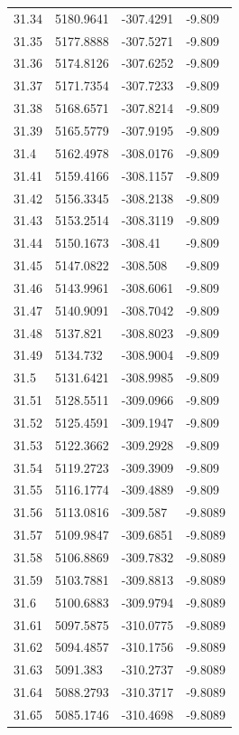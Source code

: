\begin{table}[H]
\begin{tabular}{llll}
31.34 & 5180.9641 & -307.4291 & -9.809 \\
31.35 & 5177.8888 & -307.5271 & -9.809 \\
31.36 & 5174.8126 & -307.6252 & -9.809 \\
31.37 & 5171.7354 & -307.7233 & -9.809 \\
31.38 & 5168.6571 & -307.8214 & -9.809 \\
31.39 & 5165.5779 & -307.9195 & -9.809 \\
31.4 & 5162.4978 & -308.0176 & -9.809 \\
31.41 & 5159.4166 & -308.1157 & -9.809 \\
31.42 & 5156.3345 & -308.2138 & -9.809 \\
31.43 & 5153.2514 & -308.3119 & -9.809 \\
31.44 & 5150.1673 & -308.41 & -9.809 \\
31.45 & 5147.0822 & -308.508 & -9.809 \\
31.46 & 5143.9961 & -308.6061 & -9.809 \\
31.47 & 5140.9091 & -308.7042 & -9.809 \\
31.48 & 5137.821 & -308.8023 & -9.809 \\
31.49 & 5134.732 & -308.9004 & -9.809 \\
31.5 & 5131.6421 & -308.9985 & -9.809 \\
31.51 & 5128.5511 & -309.0966 & -9.809 \\
31.52 & 5125.4591 & -309.1947 & -9.809 \\
31.53 & 5122.3662 & -309.2928 & -9.809 \\
31.54 & 5119.2723 & -309.3909 & -9.809 \\
31.55 & 5116.1774 & -309.4889 & -9.809 \\
31.56 & 5113.0816 & -309.587 & -9.8089 \\
31.57 & 5109.9847 & -309.6851 & -9.8089 \\
31.58 & 5106.8869 & -309.7832 & -9.8089 \\
31.59 & 5103.7881 & -309.8813 & -9.8089 \\
31.6 & 5100.6883 & -309.9794 & -9.8089 \\
31.61 & 5097.5875 & -310.0775 & -9.8089 \\
31.62 & 5094.4857 & -310.1756 & -9.8089 \\
31.63 & 5091.383 & -310.2737 & -9.8089 \\
31.64 & 5088.2793 & -310.3717 & -9.8089 \\
31.65 & 5085.1746 & -310.4698 & -9.8089 \\

\end{tabular}
\end{table}
